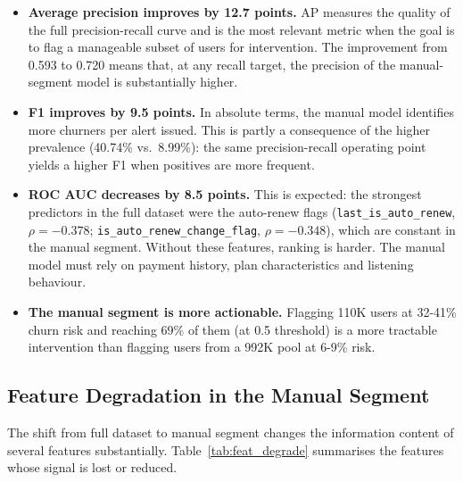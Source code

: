 \documentclass{article}
\begin{document}
\begin{itemize}
    \item \textbf{Average precision improves by 12.7 points.} AP measures the quality of the full precision-recall curve and is the most relevant metric when the goal is to flag a manageable subset of users for intervention. The improvement from 0.593 to 0.720 means that, at any recall target, the precision of the manual-segment model is substantially higher.
    \item \textbf{F1 improves by 9.5 points.} In absolute terms, the manual model identifies more churners per alert issued. This is partly a consequence of the higher prevalence (40.74\% vs.\ 8.99\%): the same precision-recall operating point yields a higher F1 when positives are more frequent.
    \item \textbf{ROC AUC decreases by 8.5 points.} This is expected: the strongest predictors in the full dataset were the auto-renew flags (\texttt{last\_is\_auto\_renew}, $\rho=-0.378$; \texttt{is\_auto\_renew\_change\_flag}, $\rho=-0.348$), which are constant in the manual segment. Without these features, ranking is harder. The manual model must rely on payment history, plan characteristics and listening behaviour.
    \item \textbf{The manual segment is more actionable.} Flagging 110K users at 32-41\% churn risk and reaching 69\% of them (at 0.5 threshold) is a more tractable intervention than flagging users from a 992K pool at 6-9\% risk.
\end{itemize}

\subsection{Feature Degradation in the Manual Segment}\label{sec:feature_degradation}

The shift from full dataset to manual segment changes the information content of several features substantially. Table~\ref{tab:feat_degrade} summarises the features whose signal is lost or reduced.
\end{document}
